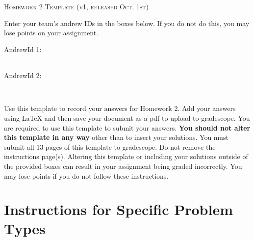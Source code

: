 \documentclass[12pt]{article}
\begin{document}
\section*{}
\begin{center}
  \centerline{\textsc{\LARGE  Homework 2 Template (v1, released Oct. 1st)}}
\end{center}

Enter your team's andrew IDs in the boxes below.  If you do not do this, you may lose points on your assignment.

AndrewId 1: \begin{tcolorbox}[fit,height=1cm, width=5cm, blank, borderline={1pt}{1pt},nobeforeafter]
    \begin{center}
    \vspace{3mm}
    \end{center}
\end{tcolorbox}
    \\
AndrewId 2: \begin{tcolorbox}[fit,height=1cm, width=5cm, blank, borderline={1pt}{1pt},nobeforeafter]
    \begin{center}
    \vspace{3mm}
    \end{center}
\end{tcolorbox} \\
\vspace{0.5cm}

Use this template to record your answers for Homework 2.  Add your answers using LaTeX and then save your document as a pdf to upload to gradescope.  You are required to use this template to submit your answers.  \textbf{You should not alter this template in any way} other than to insert your solutions.  You must submit all 13 pages of this template to gradescope.  Do not remove the instructions page(s).  Altering this template or including your solutions outside of the provided boxes can result in your assignment being graded incorrectly.  You may lose points if you do not follow these instructions.

\section*{Instructions for Specific Problem Types}


\end{document}
